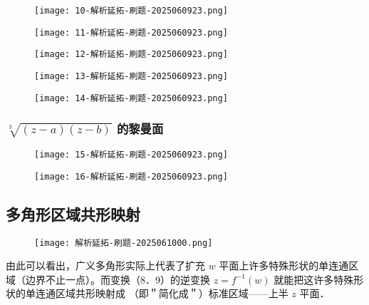 \begin{figure}[H]
\centering
\texttt{[image: 10-解析延拓-刷题-2025060923.png]}
\label{}
\end{figure}
\begin{figure}[H]
\centering
\texttt{[image: 11-解析延拓-刷题-2025060923.png]}
\label{}
\end{figure}
\begin{figure}[H]
\centering
\texttt{[image: 12-解析延拓-刷题-2025060923.png]}
\label{}
\end{figure}
\begin{figure}[H]
\centering
\texttt{[image: 13-解析延拓-刷题-2025060923.png]}
\label{}
\end{figure}
\begin{figure}[H]
\centering
\texttt{[image: 14-解析延拓-刷题-2025060923.png]}
\label{}
\end{figure}

\subsubsection{\texorpdfstring{$\sqrt[3]{ (z-a)(z-b) }$}{sqrt[3] (z-a)(z-b)} 的黎曼面}

\begin{figure}[H]
\centering
\texttt{[image: 15-解析延拓-刷题-2025060923.png]}
\label{}
\end{figure}
\begin{figure}[H]
\centering
\texttt{[image: 16-解析延拓-刷题-2025060923.png]}
\label{}
\end{figure}

\subsection{多角形区域共形映射}

\begin{figure}[H]
\centering
\texttt{[image: 解析延拓-刷题-2025061000.png]}
\label{}
\end{figure}

\begin{remark}
由此可以看出，广义多角形实际上代表了扩充 $w$ 平面上许多特殊形状的单连通区域（边界不止一点）。而变换（8．9）的逆变换 $z=f^{-1}(w)$ 就能把这许多特殊形状的单连通区域共形映射成 （即＂简化成＂）标准区域——上半 $z$ 平面．
\end{remark}
